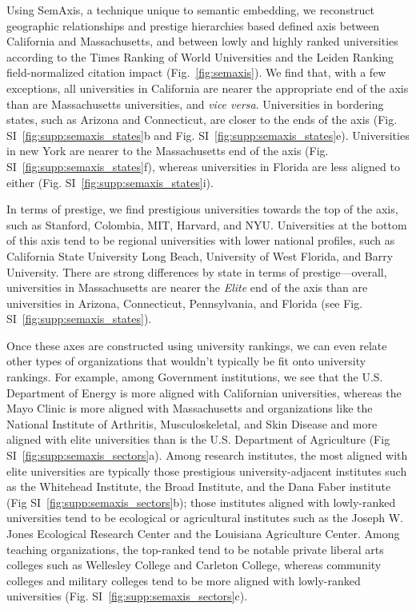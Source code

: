 \documentclass[12pt]{article} %
\begin{document}
Using SemAxis, a technique unique to semantic embedding, we reconstruct geographic relationships and prestige hierarchies based defined axis between California and Massachusetts, and between lowly and highly ranked universities according to the Times Ranking of World Universities and the Leiden Ranking field-normalized citation impact (Fig.~\ref{fig:semaxis}). 
We find that, with a few exceptions, all universities in California are nearer the appropriate end of the axis than are Massachusetts universities, and \textit{vice versa}.
Universities in bordering states, such as Arizona and Connecticut, are closer to the ends of the axis (Fig. SI~\ref{fig:supp:semaxis_states}b and Fig. SI~\ref{fig:supp:semaxis_states}e). 
Universities in new York are nearer to the Massachusetts end of the axis (Fig. SI~\ref{fig:supp:semaxis_states}f), whereas universities in Florida are less aligned to either (Fig. SI~\ref{fig:supp:semaxis_states}i). 

In terms of prestige, we find prestigious universities towards the top of the axis, such as Stanford, Colombia, MIT, Harvard, and NYU. 
Universities at the bottom of this axis tend to be regional universities with lower national profiles, such as California State University Long Beach, University of West Florida, and Barry University. 
There are strong differences by state in terms of prestige—overall, universities in Massachusetts are nearer the \textit{Elite} end of the axis than are universities in Arizona, Connecticut, Pennsylvania, and Florida (see Fig. SI~\ref{fig:supp:semaxis_states}). 

Once these axes are constructed using university rankings, we can even relate other types of organizations that wouldn't typically be fit onto university rankings.
For example, among Government institutions, we see that the U.S. Department of Energy is more aligned with Californian universities, whereas the Mayo Clinic is more aligned with Massachusetts and organizations like the National Institute of Arthritis, Musculoskeletal, and Skin Disease and more aligned with elite universities than is the U.S. Department of Agriculture (Fig SI~\ref{fig:supp:semaxis_sectors}a).
Among research institutes, the most aligned with elite universities are typically those prestigious university-adjacent institutes such as the Whitehead Institute, the Broad Institute, and the Dana Faber institute (Fig SI~\ref{fig:supp:semaxis_sectors}b); those institutes aligned with lowly-ranked universities tend to be ecological or agricultural institutes such as the Joseph W. Jones Ecological Research Center and the Louisiana Agriculture Center. 
Among teaching organizations, the top-ranked tend to be notable private liberal arts colleges such as Wellesley College and Carleton College, whereas community colleges and military colleges tend to be more aligned with lowly-ranked universities (Fig. SI~\ref{fig:supp:semaxis_sectors}c). 
\end{document}
